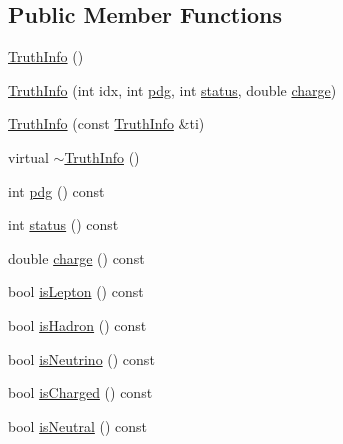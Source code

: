 \subsection*{Public Member Functions}
\begin{DoxyCompactItemize}
\item 
\hyperlink{classAnalysis_1_1FastJet_1_1TruthInfo_a9f95f6e6557d67d77703a816fc913746}{Truth\+Info} ()
\item 
\hyperlink{classAnalysis_1_1FastJet_1_1TruthInfo_a983c57b1d61815b8e61e6debafc9a376}{Truth\+Info} (int idx, int \hyperlink{classAnalysis_1_1FastJet_1_1TruthInfo_ac1a7c34a77d7f0fc815ede73c35607ad}{pdg}, int \hyperlink{classAnalysis_1_1FastJet_1_1TruthInfo_a52a4e57c1e862882218f1e20ca9220c8}{status}, double \hyperlink{classAnalysis_1_1FastJet_1_1TruthInfo_a7d09bc00a310b2511bfc0ee4de23360c}{charge})
\item 
\hyperlink{classAnalysis_1_1FastJet_1_1TruthInfo_a0f0755f08f4cd85e21e646b0fbd6e47d}{Truth\+Info} (const \hyperlink{classAnalysis_1_1FastJet_1_1TruthInfo}{Truth\+Info} \&ti)
\item 
virtual \hyperlink{classAnalysis_1_1FastJet_1_1TruthInfo_a62a6d53a837ff38df9f7a7328bfb4d45}{$\sim$\+Truth\+Info} ()
\item 
int \hyperlink{classAnalysis_1_1FastJet_1_1TruthInfo_ac1a7c34a77d7f0fc815ede73c35607ad}{pdg} () const 
\item 
int \hyperlink{classAnalysis_1_1FastJet_1_1TruthInfo_a52a4e57c1e862882218f1e20ca9220c8}{status} () const 
\item 
double \hyperlink{classAnalysis_1_1FastJet_1_1TruthInfo_a7d09bc00a310b2511bfc0ee4de23360c}{charge} () const 
\item 
bool \hyperlink{classAnalysis_1_1FastJet_1_1TruthInfo_a1cdab47e0a01229a93aeebdbfbc4a993}{is\+Lepton} () const 
\item 
bool \hyperlink{classAnalysis_1_1FastJet_1_1TruthInfo_ac6f4703af5217047f0bc92f7853068a4}{is\+Hadron} () const 
\item 
bool \hyperlink{classAnalysis_1_1FastJet_1_1TruthInfo_a87297aa11e7f43dd729cdb709406a4d5}{is\+Neutrino} () const 
\item 
bool \hyperlink{classAnalysis_1_1FastJet_1_1TruthInfo_a1b994926fce41dc264134f1e61bdef00}{is\+Charged} () const 
\item 
bool \hyperlink{classAnalysis_1_1FastJet_1_1TruthInfo_a4edb489e915f6fcd967e8aa5b08b1027}{is\+Neutral} () const 
\end{DoxyCompactItemize}
